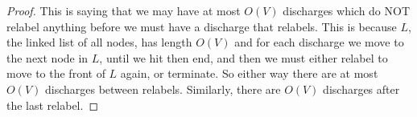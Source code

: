 \documentclass[reqno]{amsbook}
\theoremstyle{plain}
\numberwithin{section}{chapter}
\numberwithin{equation}{chapter}
\theoremstyle{definition}
\theoremstyle{remark}
\begin{document}
\begin{proof}
This is saying that we may have at most $O(V)$ discharges which do NOT relabel anything before we must have a discharge that relabels. This is because $L$, the linked list of all nodes, has length $O(V)$ and for each discharge we move to the next node in $L$, until we hit then end, and then we must either relabel to move to the front of $L$ again, or terminate. So either way there are at most $O(V)$ discharges between relabels. Similarly, there are $O(V)$ discharges after the last relabel. 
\end{proof}






 






































\appendix
%

\backmatter


\printindex
\end{document}
